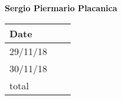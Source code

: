 \documentclass[../main.tex]{subfiles}
\begin{document}
\vspace{1cm}

\newpage

\begin{center}
	{\bf Sergio Piermario Placanica}
	\vspace{2mm}

		\begin{tabular}{p{1.3cm}|p{1.8cm}|p{6.7cm}}
			\hline
			\bf Date & \bf \makebox[1.8cm][c]{Hours} & \bf \makebox[6.7cm][c]{Description} \\
			\hline
			29/11/18 & \makebox[1.8cm][c]{2h} & \makebox[6.7cm][c]{Architechtural Design}\\
			30/11/18 & \makebox[1.8cm][c]{1h} & \makebox[6.7cm][c]{Architectural Design}\\

			total    & \makebox[1.8cm][c]{3h}
		\end{tabular}
	\end{center}
\end{document}
